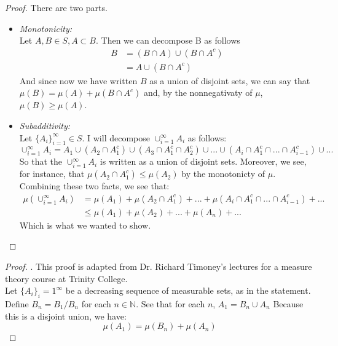 \documentclass[12pt]{article}
\newenvironment{problem}[2][Problem]{\begin{trivlist}
\item[\hskip \labelsep {\bfseries #1}\hskip \labelsep {\bfseries #2.}]}{\end{trivlist}}
\theoremstyle{definition}
\theoremstyle{definition}
\theoremstyle{definition}
\theoremstyle{definition}
\begin{document}
\begin{problem}{1.17}
\begin{proof} There are two parts.
\begin{itemize}
\item \textit{Monotonicity:} \\
Let $A, B \in S, A \subset B$. Then we can decompose B as follows
\begin{align*}
B &= (B \cap A) \cup (B \cap A^c) \\
 &= A \cup (B \cap A^c)
\end{align*}
And since now we have written $B$ as a union of disjoint sets, we can say that $\mu(B) = \mu(A) + \mu(B \cap A^c) $ and, by the nonnegativaty of $\mu$, $\mu(B) \geq \mu(A)$.
\item \textit{Subadditivity:} \\
Let $\{ A_i \}_{i=1}^{\infty} \in S $. I will decompose $\cup_{i=1}^{\infty}A_i$ as follows: 
$$ \cup_{i=1}^{\infty}A_i = A_1 \cup (A_2 \cap A_1^c) \cup (A_3 \cap A_1^c \cap A_2^c) \cup ... \cup (A_i \cap A_1^c \cap ... \cap A_{i-1}^c) \cup ... $$
So that the $\cup_{i=1}^{\infty}A_i$ is written as a union of disjoint sets. Moreover, we see, for instance, that $\mu(A_2 \cap A_1^c) \leq \mu(A_2)$ by the monotonicty of $\mu$. Combining these two facts, we see that: 
\begin{align*}
\mu(\cup_{i=1}^{\infty}A_i) &= \mu(A_1) 
+ \mu(A_2 \cap A_1^c) + ... + \mu(A_i \cap A_1^c \cap ... \cap A_{i-1}^c) + ... \\
&\leq \mu(A_1)+\mu(A_2)+...+\mu(A_n)+...
\end{align*}
Which is what we wanted to show.
\end{itemize}
\end{proof}
\end{problem}

\begin{problem}{1.20}
\begin{proof}. This proof is adapted from Dr. Richard Timoney's lectures for a measure theory course at Trinity College. \\
Let $\{A_i\}_i=1^{\infty}$ be a decreasing sequence of measurable sets, as in the statement. Define $B_n = B_1 / B_n$ for each $n \in \mathbb{N}$. See that for each $n$, $A_1 = B_n \cup A_n$ Because this is a disjoint union, we have:
\begin{equation}
\mu(A_1) = \mu(B_n) + \mu(A_n)  
\end{equation}
\end{proof}
\end{problem}
\end{document}
